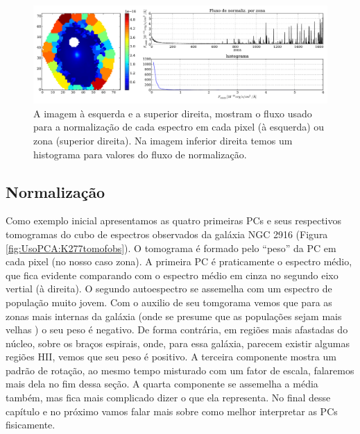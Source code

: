 \begin{figure}
    \includegraphics[width=1.\textwidth]{figuras/K0277-fobs_norm.pdf}
    \caption[Fluxos de normalização para cada zona da galáxia K0277.]
    {A imagem à esquerda e a superior direita, mostram o fluxo usado para a normalização de cada espectro em
    cada pixel (à esquerda) ou zona (superior direita). Na imagem inferior direita temos um histograma para valores do
    fluxo de normalização.}
    \label{fig:UsoPCA:K277fobsnorm}
\end{figure}

\subsection{Normalização}

Como exemplo inicial apresentamos as quatro primeiras PCs e seus respectivos tomogramas do cubo de espectros observados
da galáxia NGC 2916 (Figura \ref{fig:UsoPCA:K277tomofobs}). O tomograma é formado pelo ``peso'' da PC em cada pixel (no
nosso caso zona). A primeira PC é praticamente o espectro médio, que fica evidente comparando com o espectro médio em
cinza no segundo eixo vertial (à direita). O segundo autoespectro se assemelha com um espectro de população muito jovem.
Com o auxilio de seu tomgorama vemos que para as zonas mais internas da galáxia (\fixme onde se presume que as
populações sejam mais velhas \citneed) o seu peso é negativo. De forma contrária, em regiões mais afastadas do núcleo,
sobre os braços espirais, onde, para essa galáxia, parecem existir algumas regiões HII, vemos que seu peso é positivo. A
terceira componente mostra um padrão de rotação, ao mesmo tempo misturado com um fator de escala, falaremos mais dela no
fim dessa seção. A quarta componente se assemelha a média também, mas fica mais complicado dizer o que ela representa.
No final desse capítulo e no próximo vamos falar mais sobre como melhor interpretar as PCs fisicamente.

